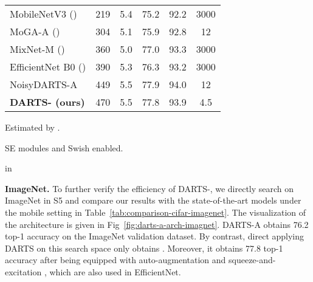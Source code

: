 \documentclass{article} \usepackage{iclr2021_conference,times}
\newcommand{\citeyp}[1]{(\citeyear{#1})}
\begin{document}
\begin{table}[tb!]
\begin{center}
\begin{scriptsize}
\begin{minipage}{0.5\textwidth}
\begin{threeparttable}
\begin{tabular}{*{2}{l}*{3}{l}c}
				\midrule
				MobileNetV3 \citeyp{howard2019searching} & 219 & 5.4 &75.2 &92.2&3000 \\
MoGA-A \citeyp{chumoga} & 304 & 5.1 & 75.9 & 92.8 & 12 \\
				MixNet-M \citeyp{tan2020mixconv} &360 & 5.0 & 77.0 & 93.3& 3000\\
				EfficientNet B0 \citeyp{tan2019efficientnet} &390 & 5.3  & 76.3 &93.2 &3000 \\
				NoisyDARTS-A &449 & 5.5 & 77.9 & 94.0 & 12\\


\textbf{DARTS- (ours)} & 470  & 5.5 &  77.8& 93.9 &4.5 \\
				\bottomrule
			\end{tabular}
			\begin{tablenotes}
			\scriptsize
			\item[] Estimated by \cite{wu2018fbnet}.
			\item[] SE modules and Swish enabled. 
			\end{tablenotes}
			\end{threeparttable}
			\end{minipage}
		\end{scriptsize}
	\end{center}
	 in
\end{table}








\textbf{ImageNet.}
To further verify the efficiency of DARTS-, we directly search on ImageNet in S5 and compare our results with the state-of-the-art models under the mobile setting in Table~\ref{tab:comparison-cifar-imagenet}. The visualization of the architecture is given in Fig~\ref{fig:darts-a-arch-imagnet}. DARTS-A obtains 76.2 top-1 accuracy on the ImageNet validation dataset. By contrast, direct applying DARTS on this search space only obtains  \citep{chu2019fair}. Moreover, it obtains 77.8 top-1 accuracy after being equipped with auto-augmentation \citep{cubuk2018autoaugment} and squeeze-and-excitation \citep{hu2018squeeze}, which are also used in EfficientNet.
\end{document}

